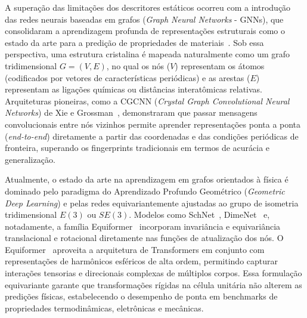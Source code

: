 A superação das limitações dos descritores estáticos ocorreu com a introdução das redes neurais baseadas em grafos (\textit{Graph Neural Networks} - GNNs), que consolidaram a aprendizagem profunda de representações estruturais como o estado da arte para a predição de propriedades de materiais~\cite{xie2018crystal}. Sob essa perspectiva, uma estrutura cristalina é mapeada naturalmente como um grafo tridimensional $G = (V, E)$, no qual os nós ($V$) representam os átomos (codificados por vetores de características periódicas) e as arestas ($E$) representam as ligações químicas ou distâncias interatômicas relativas. Arquiteturas pioneiras, como a CGCNN (\textit{Crystal Graph Convolutional Neural Networks}) de Xie e Grossman~\cite{xie2018crystal}, demonstraram que passar mensagens convolucionais entre nós vizinhos permite aprender representações ponta a ponta (\textit{end-to-end}) diretamente a partir das coordenadas e das condições periódicas de fronteira, superando os fingerprints tradicionais em termos de acurácia e generalização.

Atualmente, o estado da arte na aprendizagem em grafos orientados à física é dominado pelo paradigma do Aprendizado Profundo Geométrico (\textit{Geometric Deep Learning}) e pelas redes equivariantemente ajustadas ao grupo de isometria tridimensional $E(3)$ ou $SE(3)$. Modelos como SchNet~\cite{schutt2018schnet}, DimeNet~\cite{klicpera2020directional} e, notadamente, a família Equiformer~\cite{liao2022equiformer} incorporam invariância e equivariância translacional e rotacional diretamente nas funções de atualização dos nós. O Equiformer~\cite{liao2022equiformer} aproveita a arquitetura de Transformers em conjunto com representações de harmônicos esféricos de alta ordem, permitindo capturar interações tensorias e direcionais complexas de múltiplos corpos. Essa formulação equivariante garante que transformações rígidas na célula unitária não alterem as predições físicas, estabelecendo o desempenho de ponta em benchmarks de propriedades termodinâmicas, eletrônicas e mecânicas.

